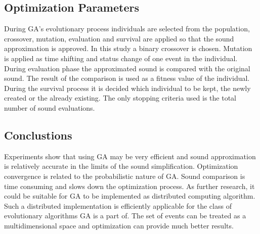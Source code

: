\documentclass[a0,portrait,25pt]{sciposter}
\begin{document}
\begin{multicols}{3}
\begin{mdframed}[backgroundcolor=white,roundcorner=4pt,shadow=true,linewidth=1pt]
\color{Black}
\section*{Optimization Parameters}
During GA's evolutionary process individuals are selected from the population, crossover, mutation, evaluation and survival are applied so that the sound approximation is approved. In this study a binary crossover is chosen. Mutation is applied as time shifting and status change of one event in the individual. During evaluation phase the approximated sound is compared with the original sound. The result of the comparison is used as a fitness value of the individual. During the survival process it is decided which individual to be kept, the newly created or the already existing. The only stopping criteria used is the total number of sound evaluations.
\end{mdframed}

\begin{mdframed}[backgroundcolor=white,roundcorner=4pt,shadow=true,linewidth=1pt]
\color{Black}
\section*{Conclustions}
Experiments show that using GA may be very efficient and sound approximation is relatively accurate in the limits of the sound simplification. Optimization convergence is related to the probabilistic nature of GA. Sound comparison is time consuming and slows down the optimization process. As further research, it could be suitable for GA to be implemented as distributed computing algorithm. Such a distributed implementation is efficiently applicable for the class of evolutionary algorithms GA is a part of. The set of events can be treated as a multidimensional space and optimization can provide much better results.
\end{mdframed}

\begin{mdframed}[backgroundcolor=white,roundcorner=4pt,shadow=true,linewidth=1pt]
\color{Black}


\end{mdframed}
\end{multicols}
\end{document}
